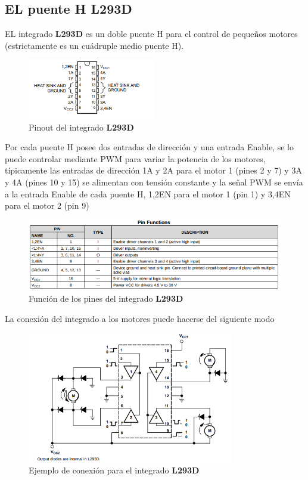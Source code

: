 \documentclass[12pt]{article}
\begin{document}
\subsection{EL puente H \textbf{L293D}}
EL integrado \textbf{L293D} es un doble puente H para el control de pequeños motores (estrictamente es un cuádruple medio puente H).

\begin{figure}[H]
    \centering
    \includegraphics[width=0.5\textwidth]{L293D}
    \caption{Pinout del integrado \textbf{L293D}}
\end{figure}

Por cada puente H posee dos entradas de dirección y una entrada Enable, se lo puede controlar mediante PWM para variar la potencia de los motores, típicamente las entradas de dirección 1A y 2A para el motor 1 (pines 2 y 7) y 3A y 4A (pines 10 y 15) se alimentan con tensión constante y la señal PWM se envía a la entrada Enable de cada puente H, 1,2EN para el motor 1 (pin 1) y 3,4EN para el motor 2 (pin 9)

\begin{figure}[H]
    \centering
    \includegraphics[width=\textwidth]{L293D-pin}
    \caption{Función de los pines del integrado \textbf{L293D}}
\end{figure}

La conexión del integrado a los motores puede hacerse del siguiente modo

\begin{figure}[H]
    \centering
    \includegraphics[width=0.8\textwidth]{L293D-func-block}
    \caption{Ejemplo de conexión para el integrado \textbf{L293D}}
\end{figure}
\end{document}
